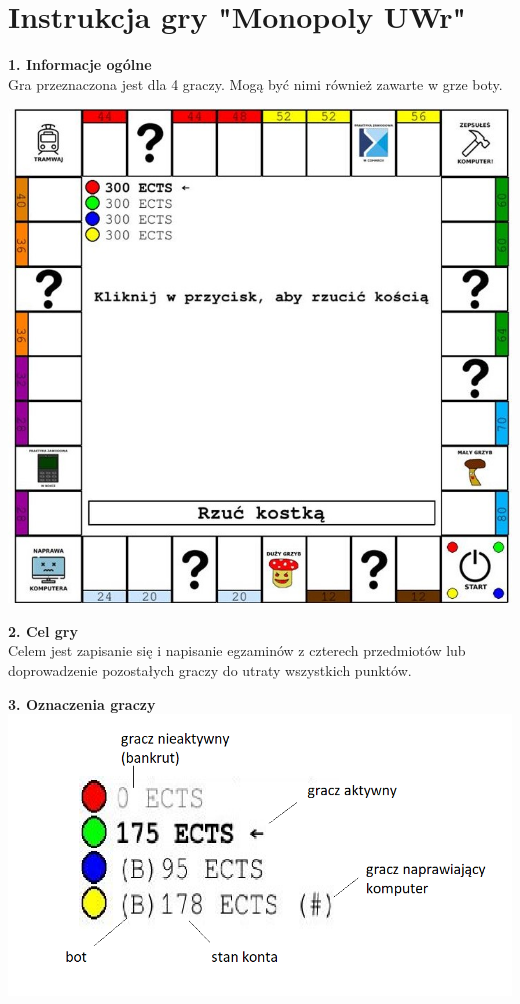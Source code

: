 \documentclass[a4paper]{article}
\author{}
\title{}
\date{\today}
\begin{document}
\section*{Instrukcja gry "Monopoly UWr"}

\noindent \textbf{1. Informacje ogólne}\\
\noindent Gra przeznaczona jest dla 4 graczy. Mogą być nimi również zawarte w grze boty.
\vspace{10pt}

\includegraphics[scale=0.6]{board.png}

\noindent \textbf{2. Cel gry}\\
\noindent Celem jest zapisanie się i napisanie egzaminów z czterech przedmiotów lub doprowadzenie pozostałych graczy do utraty wszystkich punktów.
\vspace{10pt}

\noindent \textbf{3. Oznaczenia graczy}\\
\indent \includegraphics[scale=0.5]{ozn_graczy.png}
\end{document}
